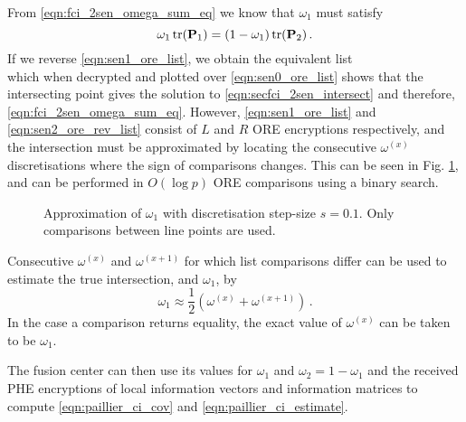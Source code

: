 \documentclass[letterpaper, 10 pt, conference]{ieeeconf}  %
\begin{document}
From \eqref{eqn:fci_2sen_omega_sum_eq} we know that $\omega_1$ must satisfy
\begin{equation}
   \omega_1 \operatorname{tr}({{\mathbf{P}}}_1) = (1-\omega_1)\operatorname{tr}({{\mathbf{P}}}_2)\,. \label{eqn:secfci_2sen_intersect}
\end{equation}
If we reverse \eqref{eqn:sen1_ore_list}, we obtain the equivalent list
\begin{equation}
   [\mathcal{E}^R_{ORE}((1-\omega^{(1)})\tr(\mP_2)),\dots,\mathcal{E}^R_{ORE}((1-\omega^{(p)})\tr(\mP_2))] \label{eqn:sen2_ore_rev_list}
\end{equation}
which when decrypted and plotted over \eqref{eqn:sen0_ore_list} shows that the intersecting point gives the solution to \eqref{eqn:secfci_2sen_intersect} and therefore, \eqref{eqn:fci_2sen_omega_sum_eq}. However, \eqref{eqn:sen1_ore_list} and \eqref{eqn:sen2_ore_rev_list} consist of $L$ and $R$ ORE encryptions respectively, and the intersection must be approximated by locating the consecutive $\omega^{(x)}$ discretisations where the sign of comparisons changes. This can be seen in Fig. \ref{fig:2_sensor_sol}, and can be performed in $O(\log{p})$ ORE comparisons using a binary search.
\begin{figure}[tb]
   \vspace{-5pt}
   \begin{center}
      
   \end{center}
   \vspace{-10pt}
   \caption{Approximation of $\omega_1$ with discretisation step-size $s=0.1$. Only comparisons between line points are used.}
   \vspace{-\baselineskip}
   \label{fig:2_sensor_sol}
\end{figure}
Consecutive $\omega^{(x)}$ and $\omega^{(x+1)}$ for which list comparisons differ can be used to estimate the true intersection, and $\omega_1$, by
\begin{equation}
   \omega_1 \approx \frac{1}{2}(\omega^{(x)} + \omega^{(x+1)})\,. \label{eqn:secfci_2sen_omega}
\end{equation}
In the case a comparison returns equality, the exact value of $\omega^{(x)}$ can be taken to be $\omega_1$.

The fusion center can then use its values for $\omega_1$ and $\omega_2 = 1-\omega_1$ and the received PHE encryptions of local information vectors and information matrices to compute \eqref{eqn:paillier_ci_cov} and \eqref{eqn:paillier_ci_estimate}.

\end{document}
